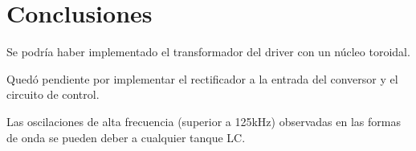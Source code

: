\section{Conclusiones}



Se podría haber implementado el transformador del driver con un núcleo toroidal. 

Quedó pendiente por implementar el rectificador a la entrada del conversor y el circuito de control.

Las oscilaciones de alta frecuencia (superior a 125kHz) observadas en las formas de onda se pueden deber a cualquier tanque LC. 